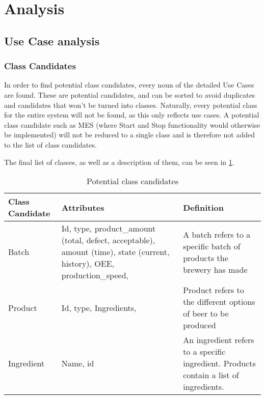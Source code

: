 \section{Analysis}

\subsection{Use Case analysis}

\subsubsection{Class Candidates}
In order to find potential class candidates, every noun of the detailed Use Cases are found.
These are potential candidates, and can be sorted to avoid duplicates and candidates that 
won’t be turned into classes. Naturally, every potential class for the entire system will 
not be found, as this only reflects use cases. A potential class candidate such as MES 
(where Start and Stop functionality would otherwise be implemented) will not be reduced to 
a single class and is therefore not added to the list of class candidates.

The final list of classes, as well as a description of them, can be seen in \ref{table:class_candidates}.

\begin{table}[ht]
    \begin{tabularx}{\textwidth}{|>{\RaggedRight}p{4cm}|>{\RaggedRight}p{6cm}|>{\RaggedRight}X|}
    \hline
    \textbf{Class Candidate} & \textbf{Attributes}                                                                                                     & \textbf{Definition}                                                                    \\ \hline
    Batch                    & Id, type, product\_amount (total, defect, acceptable), amount (time), state (current, history), OEE, production\_speed, & A batch refers to a specific batch of products the brewery has made                    \\ \hline
    Product                  & Id, type, Ingredients,                                                                                                  & Product refers to the different options of beer to be produced                         \\ \hline
    Ingredient               & Name, id                                                                                                                & An ingredient refers to a specific ingredient. Products contain a list of ingredients. \\ \hline
    \end{tabularx}
    \caption{Potential class candidates}
    \label{table:class_candidates}
    \end{table}


